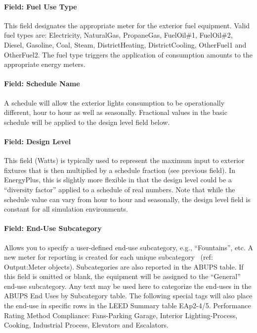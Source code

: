 \paragraph{Field: Fuel Use Type}\label{field-fuel-use-type}

This field designates the appropriate meter for the exterior fuel equipment. Valid fuel types are: Electricity, NaturalGas, PropaneGas, FuelOil\#1, FuelOil\#2, Diesel, Gasoline, Coal, Steam, DistrictHeating, DistrictCooling, OtherFuel1 and OtherFuel2. The fuel type triggers the application of consumption amounts to the appropriate energy meters.

\paragraph{Field: Schedule Name}\label{field-schedule-name-1-000}

A schedule will allow the exterior lights consumption to be operationally different, hour to hour as well as seasonally. Fractional values in the basic schedule will be applied to the design level field below.

\paragraph{Field: Design Level}\label{field-design-level-1}

This field (Watts) is typically used to represent the maximum input to exterior fixtures that is then multiplied by a schedule fraction (see previous field). In EnergyPlus, this is slightly more flexible in that the design level could be a ``diversity factor'' applied to a schedule of real numbers. Note that while the schedule value can vary from hour to hour and seasonally, the design level field is constant for all simulation environments.

\paragraph{Field: End-Use Subcategory}\label{field-end-use-subcategory-1}

Allows you to specify a user-defined end-use subcategory, e.g., ``Fountains'', etc. A new meter for reporting is created for each unique subcategory~ (ref: Output:Meter objects). Subcategories are also reported in the ABUPS table. If this field is omitted or blank, the equipment will be assigned to the ``General'' end-use subcategory. Any text may be used here to categorize the end-uses in the ABUPS End Uses by Subcategory table. The following special tags will also place the end-use in specific rows in the LEED Summary table EAp2-4/5. Performance Rating Method Compliance:  Fans-Parking Garage, Interior Lighting-Process, Cooking, Industrial Process, Elevators and Escalators.

